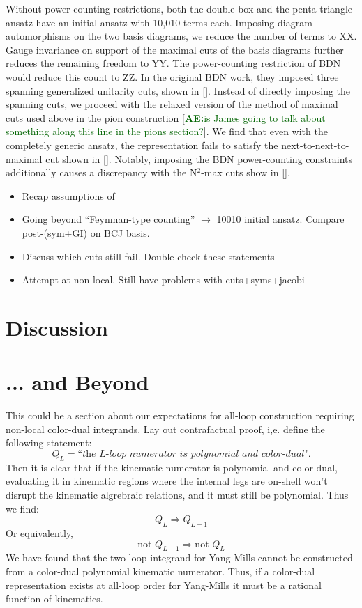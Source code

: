 \documentclass[11pt,letter]{article}
\newcommand{\ace}[1]{\textcolor{darkgreen}{\textbf{AE:}{#1}}}
\def\be{\begin{equation}}
\def\ee{\end{equation}}
\begin{document}
Without power counting restrictions, both the double-box and the
penta-triangle ansatz have an initial ansatz with 10,010 terms each.
Imposing diagram automorphisms on the two basis diagrams, we reduce
the number of terms to XX.  Gauge invariance on support of the maximal
cuts of the basis diagrams further reduces the remaining freedom to
YY.  The power-counting restriction of BDN would reduce this count to
ZZ.  In the original BDN work, they imposed three spanning generalized
unitarity cuts, shown in [].  Instead of directly imposing the
spanning cuts, we proceed with the relaxed version of the method of
maximal cuts used above in the pion construction [\ace{is James going
  to talk about something along this line in the pions section?}].  We
find that even with the completely generic ansatz, the representation
fails to satisfy the next-to-next-to-maximal cut shown in [].
Notably, imposing the BDN power-counting constraints additionally
causes a discrepancy with the N$^2$-max cuts show in [].



\begin{itemize}
\item Recap assumptions of \cite{Bern:2015ooa}
\item Going beyond ``Feynman-type counting'' $\to$ 10010 initial
  ansatz.  Compare post-(sym+GI) on BCJ basis.
\item Discuss which cuts still fail.  Double check these statements
  \item Attempt at non-local.  Still have problems with cuts+syms+jacobi
  \end{itemize}

  
\section{Discussion}\label{sec:Discussion}
\section{... and Beyond}
This could be a section about our expectations for all-loop construction requiring non-local color-dual integrands. Lay out contrafactual proof, i,e. define the following statement:
\be
 Q_L=\textit{``the $L$-loop numerator is polynomial and color-dual"}. 
\ee
Then it is clear that if the kinematic numerator is polynomial and color-dual, evaluating it in kinematic regions where the internal legs are on-shell won't disrupt the kinematic algrebraic relations, and it must still be polynomial. Thus we find:
\be
Q_L \Rightarrow Q_{L-1}
\ee
Or equivalently,
\be
\text{not }Q_{L-1}\Rightarrow \text{not }Q_L
\ee
We have found that the two-loop integrand for Yang-Mills cannot be constructed from a color-dual polynomial kinematic numerator. Thus, if a color-dual representation exists at all-loop order for Yang-Mills it must be a rational function of kinematics. 
\end{document}
